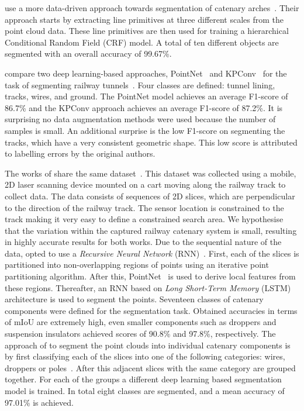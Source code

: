 \citeauthor{Chen.19} use a more data-driven approach towards segmentation of catenary arches~\cite{Chen.19}. Their approach starts by extracting line primitives at three different scales from the point cloud data. These line primitives are then used for training a hierarchical Conditional Random Field (CRF) model. A total of ten different objects are segmented with an overall accuracy of 99.67\%.

\citeauthor{soilan2019review} compare two deep learning-based approaches, PointNet~\cite{Qi.17.1} and KPConv~\cite{thomas2019KPConv} for the task of segmenting railway tunnels~\cite{soilan2019review}. Four classes are defined: tunnel lining, tracks, wires, and ground. The PointNet model achieves an average F1-score of 86.7\% and the KPConv approach achieves an average F1-score of 87.2\%. It is surprising no data augmentation methods were used because the number of samples is small. An additional surprise is the low F1-score on segmenting the tracks, which have a very consistent geometric shape. This low score is attributed to labelling errors by the original authors.

The works of \citeauthor{chen2020deep, lin2020lidar} share the same dataset~\cite{chen2020deep, lin2020lidar}. This dataset was collected using a mobile, 2D laser scanning device mounted on a cart moving along the railway track to collect data. The data consists of sequences of 2D slices, which are perpendicular to the direction of the railway track. The sensor location is constrained to the track making it very easy to define a constrained search area. We hypothesise that the variation within the captured railway catenary system is small, resulting in highly accurate results for both works.
Due to the sequential nature of the data, \citeauthor{chen2020deep} opted to use a \emph{Recursive Neural Network} (RNN)~\cite{chen2020deep}. First, each of the slices is partitioned into non-overlapping regions of points using an iterative point partitioning algorithm. After this, PointNet~\cite{Qi.17.1} is used to derive local features from these regions. Thereafter, an RNN based on \emph{Long Short-Term Memory} (LSTM) architecture is used to segment the points. Seventeen classes of catenary components were defined for the segmentation task. Obtained accuracies in terms of mIoU are extremely high, even smaller components such as droppers and suspension insulators achieved scores of 90.8\% and 97.8\%, respectively.
The approach of \citeauthor{lin2020lidar} to segment the point clouds into individual catenary components is by first classifying each of the slices into one of the following categories: wires, droppers or poles~\cite{lin2020lidar}. After this adjacent slices with the same category are grouped together. For each of the groups a different deep learning based segmentation model is trained. In total eight classes are segmented, and a mean accuracy of 97.01\% is achieved.

